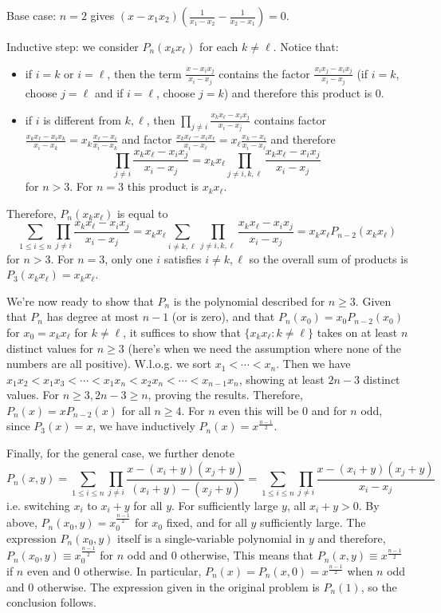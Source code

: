 \documentclass[11pt,a4paper]{article}
\begin{document}
\begin{enumerate}
	Base case: $n=2$ gives $(x-x_1x_2)(\frac{1}{x_1-x_2}-\frac{1}{x_2-x_1})=0$. 
	
	Inductive step: we consider $P_n(x_kx_{\ell})$ for each $k\neq \ell$. Notice that: 
	\begin{itemize}
		\item if $i=k$ or $i=\ell$, then the term $\frac{x-x_{i} x_{j}}{x_{i}-x_{j}}$ contains the factor $\frac{x_ix_{j}-x_ix_j}{x_i-x_j}$ (if $i=k$, choose $j=\ell$ and if $i=\ell$, choose $j=k$) and therefore this product is 0. 
		
		\item if $i$ is different from $k, \ell$, then $\prod_{j \neq i} \frac{x_kx_{\ell}-x_{i} x_{j}}{x_{i}-x_{j}}$ contains factor $\frac{x_kx_{\ell}-x_{i} x_{k}}{x_{i}-x_{k}}=x_{k}\frac{x_\ell-x_i}{x_i-x_k}$ and factor $\frac{x_kx_{\ell}-x_{i} x_{\ell}}{x_{i}-x_{\ell}}=x_{\ell}\frac{x_k-x_i}{x_i-x_\ell}$ and therefore 
		\[
		\prod_{j \neq i} \frac{x_kx_{\ell}-x_{i} x_{j}}{x_{i}-x_{j}}
		=x_kx_{\ell}\prod_{j \neq i, k, \ell} \frac{x_kx_{\ell}-x_{i} x_{j}}{x_{i}-x_{j}}
		\]
		for $n>3$. For $n=3$ this product is $x_kx_{\ell}$. 
	\end{itemize}
	Therefore, $P_n(x_{k}x_{\ell})$ is equal to 
	\[
	\sum_{1 \leqslant i \leqslant n} \prod_{j \neq i} \frac{x_kx_\ell-x_{i} x_{j}}{x_{i}-x_{j}}
	=
	x_kx_{\ell}\sum_{i\neq k, \ell} \prod_{j \neq i, k, \ell} \frac{x_kx_{\ell}-x_{i} x_{j}}{x_{i}-x_{j}}
	=x_kx_{\ell}P_{n-2}(x_kx_{\ell})
	\]
	for $n>3$. For $n=3$, only one $i$ satisfies $i\neq k, \ell$ so the overall sum of products is $P_3(x_kx_{\ell})=x_kx_{\ell}$. 
	
	We're now ready to show that $P_n$ is the polynomial described for $n\ge 3$. Given that $P_n$ has degree at most $n-1$ (or is zero), and that $P_n(x_0)=x_0P_{n-2}(x_0)$ for $x_0=x_kx_{\ell}$ for $k\neq \ell$, it suffices to show that $\{x_kx_{\ell}: k\neq \ell\}$ takes on at least $n$ distinct values for $n\ge 3$ (here's when we need the assumption where none of the numbers are all positive). 
	W.l.o.g. we sort $x_1<\cdots < x_n$. Then we have $x_1x_2<x_1x_3<\cdots < x_1x_n < x_2x_n < \cdots < x_{n-1}x_n$, showing at least $2n-3$ distinct values. For $n\ge 3, 2n-3\ge n$, proving the results. Therefore, $P_n(x)=xP_{n-2}(x)$ for all $n\ge 4$. For $n$ even this will be 0 and for $n$ odd, since $P_3(x)=x$, we have inductively $P_n(x)=x^{\frac{n-1}{2}}$. 
	
	Finally, for the general case, we further denote 
	\[
	P_n(x, y)=\sum_{1 \leqslant i \leqslant n} \prod_{j \neq i} \frac{x-(x_{i}+y)(x_{j} + y)}{(x_{i}+y)-(x_{j}+y)}
	=\sum_{1 \leqslant i \leqslant n} \prod_{j \neq i} \frac{x-(x_{i}+y)(x_{j} + y)}{x_i-x_j}
	\]
	i.e. switching $x_i$ to $x_i+y$ for all $y$. For sufficiently large $y$, all $x_i+y>0$. By above, $P_n(x_0, y)=x_0^{\frac{n-1}{2}}$ for $x_0$ fixed, and for all $y$ sufficiently large. The expression $P_n(x_0, y)$ itself is a single-variable polynomial in $y$ and therefore, $P_n(x_0, y)\equiv x_0^{\frac{n-1}{2}}$ for $n$ odd and 0 otherwise, This means that $P_n(x, y)\equiv x^{\frac{n-1}{2}}$ if $n$ even and 0 otherwise. In particular, $P_n(x)=P_n(x, 0)=x^{\frac{n-1}{2}}$ when $n$ odd and 0 otherwise. The expression given in the original problem is $P_n(1)$, so the conclusion follows. 
	

\end{enumerate}
\end{document}
